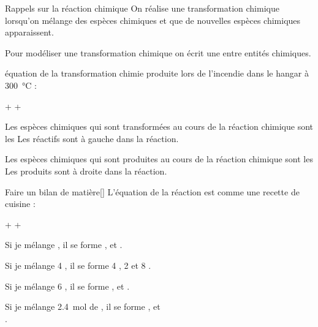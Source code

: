 \begin{doc}{Rappels sur la réaction chimique}
  On réalise une transformation chimique lorsqu’on mélange des espèces chimiques et que de nouvelles espèces chimiques apparaissent.
  \begin{importants}
    Pour modéliser une transformation chimique on écrit une  entre entités chimiques.
  \end{importants}
  équation de la transformation chimie produite lors de l’incendie dans le hangar à \qty{300}{\degreeCelsius} :
  \begin{center}
    \nitrateAmmonium\sol \reaction
    \diazote\gaz + \dioxygene\gaz + \eau\liq
  \end{center}

  \begin{multicols}{2}
    \begin{importants}
      Les espèces chimiques qui sont transformées au cours de la réaction chimique sont les 
      Les réactifs sont à gauche dans la réaction.
    \end{importants}
    \begin{importants}
      Les espèces chimiques qui sont produites au cours de la réaction chimique sont les 
      Les produits sont à droite dans la réaction.
    \end{importants}
  \end{multicols}
\end{doc}

\pasCorrection{\newpage}
\begin{doc}{Faire un bilan de matière}[\label{doc:bilan_matiere}]
  L'équation de la réaction est comme une recette de cuisine :
  \begin{center}
    \nitrateAmmonium\sol \reaction
    \diazote\gaz + \dioxygene\gaz + \eau\liq
  \end{center}
  Si je mélange  \nitrateAmmonium, il se forme  \diazote,
   \dioxygene\; et  \eau.
  
  Si je mélange 4 \nitrateAmmonium, il se forme 4 \diazote, 2 \dioxygene\; et 8 \eau.
  
  Si je mélange 6 \nitrateAmmonium, il se forme  \diazote,  \dioxygene\; et  \eau.
  
  Si je mélange \qty{2,4}{\mole} de \nitrateAmmonium, il se forme
   \diazote,
   \dioxygene\; et \\
   \eau.
\end{doc}

